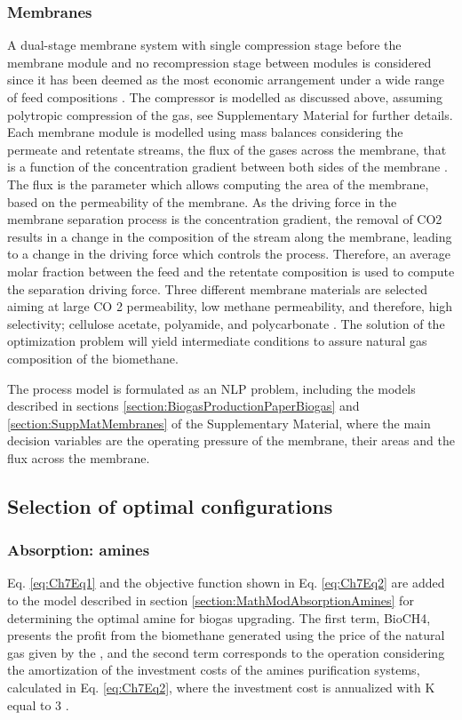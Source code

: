 \begin{refsection}[referencesCh7]
\subsubsection{Membranes} \label{section:MathModMembranes}
A dual-stage membrane system with single compression stage before the membrane module and no recompression stage between modules is considered since it has been deemed as the most economic arrangement under a wide range of feed compositions \citep{kim2017optimization}. The compressor is modelled as discussed above, assuming polytropic compression of the gas, see Supplementary Material for further details. Each membrane module is modelled using mass balances considering the permeate and retentate streams, the flux of the gases across the membrane, that is a function of the concentration gradient between both sides of the membrane \citep{FernandesRodriguesMsc}. The flux is the parameter which allows computing the area of the membrane, based on the permeability of the membrane. As the driving force in the membrane separation process is the concentration gradient, the
removal of CO2 results in a change in the composition of the stream along the membrane, leading to a change in the driving force which controls the process. Therefore, an average molar fraction between the feed and the retentate composition is used to compute the separation driving force. Three different membrane materials are selected aiming at large CO 2 permeability, low methane permeability, and therefore, high selectivity; cellulose acetate, polyamide, and polycarbonate \citep{vrbova2017upgrading}. The solution of the optimization problem will yield intermediate conditions to assure natural gas composition of the biomethane.

The process model is formulated as an NLP problem, including the models described in sections \ref{section:BiogasProductionPaperBiogas} and \ref{section:SuppMatMembranes} of the Supplementary Material, where the main decision variables are the operating pressure of the membrane, their areas and the flux across the membrane.

\subsection{Selection of optimal configurations}
\subsubsection{Absorption: amines}
Eq. \ref{eq:Ch7Eq1} and the objective function shown in Eq. \ref{eq:Ch7Eq2} are added to the model described in section \ref{section:MathModAbsorptionAmines} for determining the optimal amine for biogas upgrading. The first term, BioCH4, presents the profit from the biomethane generated using the price of the natural gas given by the \citet{EIAPrices}, and the second term corresponds to the operation considering the amortization of the investment costs of the amines purification systems, calculated in Eq. \ref{eq:Ch7Eq2}, where the investment cost is annualized with K equal to 3 \citep{douglas1988conceptual}.


\end{refsection}
